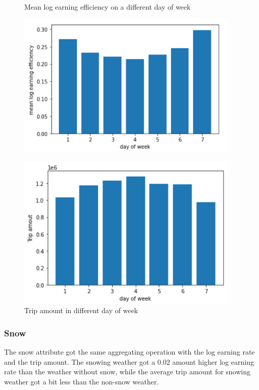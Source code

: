 \documentclass[11pt]{article}
\begin{document}
\begin{figure}[h]

\begin{minipage}{.5\textwidth}
    \centering
    \caption{Mean log earning efficiency on a different day of week}\label{f6}
    \includegraphics[width=0.95\textwidth]{plots/week1.jpg}
\end{minipage}
\begin{minipage}{.5\textwidth}
    \centering
    \caption{Trip amount in different day of week} \label{f7}
    \includegraphics[width=0.95\textwidth]{week2.jpg}
\end{minipage}

\end{figure}
\subsubsection{Snow}
The snow attribute got the same aggregating operation with the log earning rate and the trip amount. The snowing weather got a 0.02 amount higher log earning rate than the weather without snow, while the average trip amount for snowing weather got a bit less than the non-snow weather.
\end{document}
